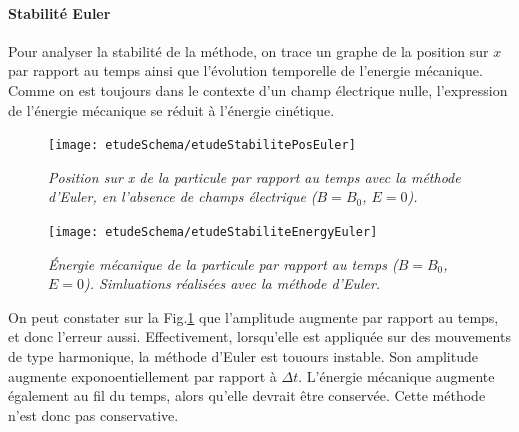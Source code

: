 \documentclass[a4paper,12pt,oneside]{article}
\begin{document}
\paragraph{Stabilité Euler}
Pour analyser la stabilité de la méthode, on trace un graphe de la position sur $x$ par rapport au temps ainsi que l'évolution temporelle de l'energie mécanique. Comme on est toujours dans le contexte d'un champ électrique nulle, l'expression de l'énergie mécanique se réduit à l'énergie cinétique.
\begin{figure}[H]
\centerline{\texttt{[image: etudeSchema/etudeStabilitePosEuler]}}
\caption{ \label{etudeStabilitePosEuler}\em
 Position sur x de la particule par rapport au temps avec la méthode d'Euler, en l'absence de champs électrique ($B=B_0$, $E=0$).
}
\end{figure}
\begin{figure}[H]

\centerline{\texttt{[image: etudeSchema/etudeStabiliteEnergyEuler]}}
\caption{ \label{etudeStabiliteEnergyEuler}\em
Énergie mécanique de la particule par rapport au temps ($B=B_0$, $E=0$). Simluations réalisées avec la méthode d'Euler.
}
\end{figure}
On peut constater sur la Fig.\ref{etudeStabilitePosEuler} que l'amplitude augmente par rapport au temps, et donc l'erreur aussi. Effectivement, lorsqu'elle est appliquée sur des mouvements de type harmonique, la méthode d'Euler est touours instable. Son amplitude augmente exponoentiellement par rapport à $\Delta t$. L'énergie mécanique augmente également au fil du temps, alors qu'elle devrait être conservée. Cette méthode n'est donc pas conservative.
\end{document}
